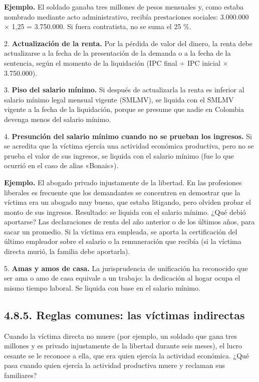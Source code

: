 \begin{ejemplo}
\textcolor[HTML]{4F6228}{\textbf{Ejemplo. }}El soldado ganaba tres millones de pesos mensuales y, como estaba nombrado mediante acto administrativo, recibía prestaciones sociales: 3.000.000 × 1,25 = 3.750.000. Si fuera contratista, no se suma el 25 \%.
\end{ejemplo}
2. \textbf{Actualización de la renta.} Por la pérdida de valor del dinero, la renta debe actualizarse a la fecha de la presentación de la demanda o a la fecha de la sentencia, según el momento de la liquidación (IPC final ÷ IPC inicial × 3.750.000).

3. \textbf{Piso del salario mínimo.} Si después de actualizarla la renta es inferior al salario mínimo legal mensual vigente (SMLMV), se liquida con el SMLMV vigente a la fecha de la liquidación, porque se presume que nadie en Colombia devenga menos del salario mínimo.

4. \textbf{Presunción del salario mínimo cuando no se prueban los ingresos.} Si se acredita que la víctima ejercía una actividad económica productiva, pero no se prueba el valor de sus ingresos, se liquida con el salario mínimo (fue lo que ocurrió en el caso de alias «Bonais»).

\begin{ejemplo}
\textcolor[HTML]{4F6228}{\textbf{Ejemplo. }}El abogado privado injustamente de la libertad. En las profesiones liberales es frecuente que los demandantes se concentren en demostrar que la víctima era un abogado muy bueno, que estaba litigando, pero olviden probar el monto de sus ingresos. Resultado: se liquida con el salario mínimo. ¿Qué debió aportarse? Las declaraciones de renta del año anterior o de los últimos años, para sacar un promedio. Si la víctima era empleada, se aporta la certificación del último empleador sobre el salario o la remuneración que recibía (si la víctima directa murió, la familia debe aportarla).
\end{ejemplo}
5. \textbf{Amas y amos de casa.} La jurisprudencia de unificación ha reconocido que ser ama o amo de casa equivale a un trabajo: la dedicación al hogar ocupa el mismo tiempo laboral. Se liquida con base en el salario mínimo.

\subsection{4.8.5. Reglas comunes: las víctimas indirectas}
Cuando la víctima directa no muere (por ejemplo, un soldado que gana tres millones y es privado injustamente de la libertad durante seis meses), el lucro cesante se le reconoce a ella, que era quien ejercía la actividad económica. ¿Qué pasa cuando quien ejercía la actividad productiva muere y reclaman sus familiares?

